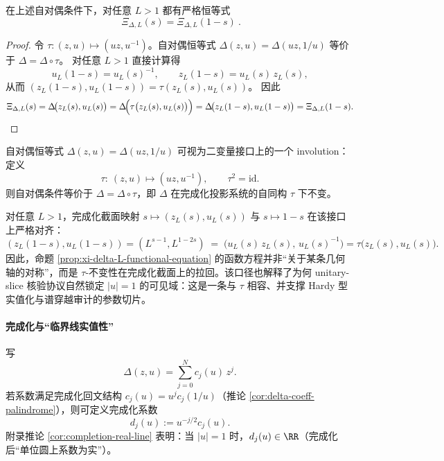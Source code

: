 \begin{proposition}\label{prop:xi-delta-L-functional-equation}
在上述自对偶条件下，对任意 \(L>1\) 都有严格恒等式
\[
\boxed{\ \Xi_{\Delta,L}(s)=\Xi_{\Delta,L}(1-s)\ }.
\]
\end{proposition}
\begin{proof}
令 \(\tau:(z,u)\mapsto(uz,u^{-1})\)。自对偶恒等式 \(\Delta(z,u)=\Delta(uz,1/u)\) 等价于 \(\Delta=\Delta\circ\tau\)。
对任意 \(L>1\) 直接计算得
\[
u_L(1-s)=u_L(s)^{-1},\qquad z_L(1-s)=u_L(s)\,z_L(s),
\]
从而 \((z_L(1-s),u_L(1-s))=\tau(z_L(s),u_L(s))\)。
因此
\[
\Xi_{\Delta,L}(s)
=\Delta\!\bigl(z_L(s),u_L(s)\bigr)
=\Delta\!\Bigl(\tau\bigl(z_L(s),u_L(s)\bigr)\Bigr)
=\Delta\!\bigl(z_L(1-s),u_L(1-s)\bigr)
=\Xi_{\Delta,L}(1-s).
\]
\end{proof}

\begin{remark}\label{rem:xi-projection-system-automorphism}
自对偶恒等式 \(\Delta(z,u)=\Delta(uz,1/u)\) 可视为二变量接口上的一个 involution：
定义
\[
\tau:\ (z,u)\longmapsto (uz,u^{-1}),
\qquad \tau^2=\mathrm{id}.
\]
则自对偶条件等价于 \(\Delta=\Delta\circ\tau\)，即 \(\Delta\) 在完成化投影系统的自同构 \(\tau\) 下不变。
\par
对任意 \(L>1\)，完成化截面映射 \(s\mapsto (z_L(s),u_L(s))\) 与 \(s\mapsto 1-s\) 在该接口上严格对齐：
\[
(z_L(1-s),u_L(1-s))
=(L^{s-1},L^{1-2s})
\;=\;
\bigl(u_L(s)\,z_L(s),\,u_L(s)^{-1}\bigr)
=\tau\bigl(z_L(s),u_L(s)\bigr).
\]
因此，命题 \ref{prop:xi-delta-L-functional-equation} 的函数方程并非“关于某条几何轴的对称”，而是 \(\tau\)-不变性在完成化截面上的拉回。该口径也解释了为何 unitary-slice 核验协议自然锁定 \(|u|=1\) 的可见域：这是一条与 \(\tau\) 相容、并支撑 Hardy 型实值化与谱穿越审计的参数切片。
\end{remark}

\paragraph{完成化与“临界线实值性”}
写
\[
\Delta(z,u)=\sum_{j=0}^{N}c_j(u)\,z^j.
\]
若系数满足完成化回文结构 \(c_j(u)=u^j c_j(1/u)\)（推论 \ref{cor:delta-coeff-palindrome}），则可定义完成化系数
\[
d_j(u):=u^{-j/2}c_j(u).
\]
附录推论 \ref{cor:completion-real-line} 表明：当 \(|u|=1\) 时，\(d_j(u)\in\RR\)（完成化后“单位圆上系数为实”）。

